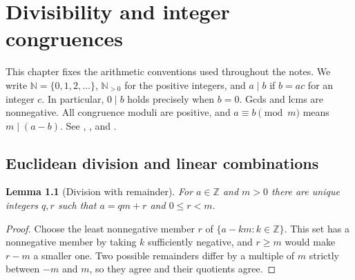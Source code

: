 \documentclass[11pt,oneside,openany]{book}
\theoremstyle{plain}
\newtheorem{lemma}[theorem]{Lemma}
\theoremstyle{definition}
\theoremstyle{remark}
\begin{document}
\mainmatter
\chapter{Divisibility and integer congruences}
\label{chap:integers}

This chapter fixes the arithmetic conventions used throughout the notes.
We write $\mathbb N=\{0,1,2,\ldots\}$, $\mathbb N_{>0}$ for the positive
integers, and $a\mid b$ if $b=ac$ for an integer $c$. In particular,
$0\mid b$ holds precisely when $b=0$. Gcds and lcms are nonnegative.
All congruence moduli are positive, and $a\equiv b\pmod m$ means
$m\mid(a-b)$. See \cite[Chs.~I, V, VIII]{hardy-wright},
\cite[Chs.~1 and 5]{apostol}, and \cite[Chs.~2 and 4]{shoup}.

\section{Euclidean division and linear combinations}

\begin{lemma}[Division with remainder]\label{nt:division}
For $a\in\mathbb Z$ and $m>0$ there are unique integers $q,r$ such that
$a=qm+r$ and $0\le r<m$.
\end{lemma}
\begin{proof}
Choose the least nonnegative member $r$ of $\{a-km:k\in\mathbb Z\}$.
This set has a nonnegative member by taking $k$ sufficiently negative,
and $r\ge m$ would make $r-m$ a smaller one. Two possible remainders
differ by a multiple of $m$ strictly between $-m$ and $m$, so they
agree and their quotients agree.
\end{proof}
\end{document}
